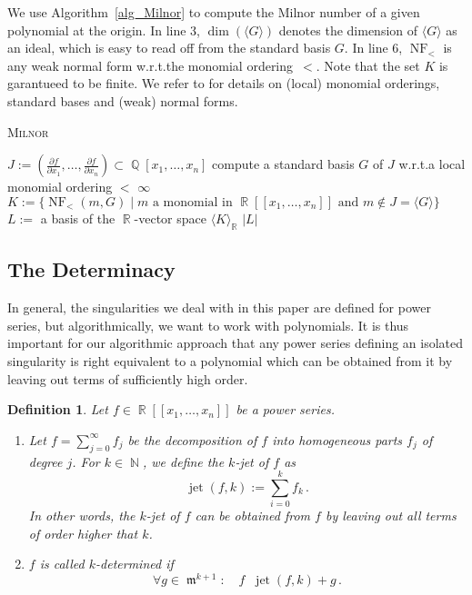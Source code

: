 \documentclass[noend]{amsproc}
\newtheorem{defn}[theorem]{Definition}
\DeclareMathOperator{\requiv}{\overset{r}{\sim}}
\DeclareMathOperator{\m}{\mathfrak{m}}
\DeclareMathOperator{\jet}{jet}
\DeclareMathOperator{\NF}{NF}
\DeclareMathOperator{\N}{\mathbb{N}}
\DeclareMathOperator{\Q}{\mathbb{Q}}
\DeclareMathOperator{\R}{\mathbb{R}}
\begin{document}
We use Algorithm~\ref{alg_Milnor} to compute the Milnor number of a given
polynomial at the origin. In line 3, $\dim(\langle G \rangle)$ denotes the
dimension of $\langle G \rangle$ as an ideal, which is easy to read off from
the standard basis $G$. In line 6, $\NF_<$ is any weak normal form w.r.t.\@ the
monomial ordering~$<$. Note that the set $K$ is garantueed to be finite. We
refer to \cite{GP2008} for details on (local) monomial orderings, standard
bases and (weak) normal forms.

\begin{algorithm}[h]
\caption{\label{alg_Milnor} \textsc{Milnor}}
\begin{algorithmic}[1]

\REQUIRE{$f \in \Q[x_1,\ldots,x_n]$}

\STATE $J := \left( \frac{\partial f}{\partial x_1}, \ldots,
\frac{\partial f}{\partial x_n} \right) \subset \Q[x_1,\ldots,x_n]$
\STATE compute a standard basis $G$ of $J$ w.r.t.\@ a local monomial ordering
$<$
\RETURN $\infty$
\ELSE
\STATE $K := \{\NF_<(m, G) \mid m \text{ a monomial in } \R[[x_1,\ldots,x_n]]
\text{ and } m \not\in J = \langle G \rangle \}$
\STATE $L :=$ a basis of the $\R$-vector space $\langle K \rangle_{\R}$
\RETURN $|L|$
\ENDIF

\end{algorithmic}
\end{algorithm}

\subsection{The Determinacy}

In general, the singularities we deal with in this paper are defined for power
series, but algorithmically, we want to work with polynomials. It is thus
important for our algorithmic approach that any power series defining an
isolated singularity is right equivalent to a polynomial which can be obtained
from it by leaving out terms of sufficiently high order.

\begin{defn}
Let $f \in \R[[x_1,\ldots,x_n]]$ be a power series.

\begin{enumerate}
\item Let $f = \sum_{j=0}^\infty f_j$ be the decomposition of $f$ into
homogeneous parts $f_j$ of degree $j$.
For $k \in \N$, we define the \emph{$k$-jet} of $f$ as
\[
\jet(f,k) := \sum_{i=0}^k f_k \,.
\]
In other words, the $k$-jet of $f$ can be obtained from $f$ by leaving out all
terms of order higher that $k$.

\item $f$ is called \emph{$k$-determined} if
\[
\forall g \in \m^{k+1}: \quad f \requiv \jet(f,k)+g \,.
\]
\end{enumerate}
\end{defn}
\end{document}
